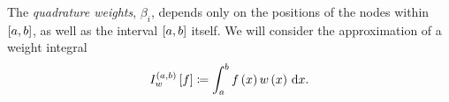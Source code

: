 \begin{frame}
	The \emph{quadrature weights}, $\beta_{i}$, depends only on the
	positions of the nodes within $\left[a,b\right]$, as well as the
	interval $\left[a,b\right]$ itself.
	We will consider the approximation of a weight integral
	\begin{equation*}
		I^{\openinterval}_{w}
		\left[f\right]\coloneqq
		\int_{a}^{b}
		f\left(x\right)
		w\left(x\right)
		\dl x.
	\end{equation*}


\end{frame}
